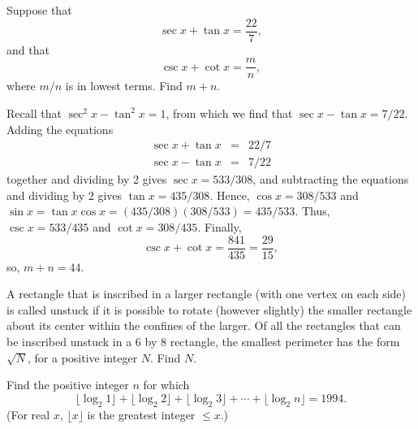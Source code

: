 \documentclass[11pt]{article}
\theoremstyle{definition}
\begin{document}
\begin{question}[name={1991 AIME, \href{https://artofproblemsolving.com/community/c4p43833}{Problem 9}}]
	Suppose that $$\sec x+\tan x=\frac{22}7,$$ and that $$\csc x+\cot x=\frac mn,$$ where $m/n$ is in lowest terms. Find $m+n.$	
\end{question}


\begin{solution}[name={Solution by chess64}]
	Recall that $\sec^2 x - \tan^2 x = 1$, from which we find that $\sec x - \tan x = 7/22$. Adding the equations\begin{eqnarray*} \sec x + \tan x &=& 22/7\\\sec x- \tan x &=& 7/22\end{eqnarray*}together and dividing by 2 gives $\sec x = 533/308$, and subtracting the equations and dividing by 2 gives $\tan x = 435/308$. Hence, $\cos x = 308/533$ and $\sin x=\tan x \cos x = (435/308)(308/533)=435/533$. Thus, $\csc x = 533/435$ and $\cot x = 308/435$. Finally,\[ \csc x + \cot x = \frac{841}{435}=\frac{29}{15}, \]so, $m+n=\boxed {44}$.
\end{solution}




\begin{question}[name={1993 AIME, \href{https://artofproblemsolving.com/community/c4p424589}{Problem 14}}]
	A rectangle that is inscribed in a larger rectangle (with one vertex on each side) is called unstuck if it is possible to rotate (however slightly) the smaller rectangle about its center within the confines of the larger. Of all the rectangles that can be inscribed unstuck in a 6 by 8 rectangle, the smallest perimeter has the form $\sqrt{N}$, for a positive integer $N$. Find $N$.
\end{question}







\begin{question}[name={1994 AIME, \href{https://artofproblemsolving.com/community/c4p73948}{Problem 4}}]
	Find the positive integer $n$ for which\[ \lfloor \log_2{1}\rfloor+\lfloor\log_2{2}\rfloor+\lfloor\log_2{3}\rfloor+\cdots+\lfloor\log_2{n}\rfloor=1994.  \](For real $x$, $\lfloor x\rfloor$ is the greatest integer $\le x.$)
\end{question}


%	
\end{document}
